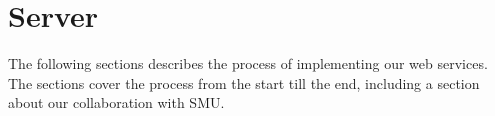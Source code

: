 \section{Server}
The following sections describes the process of implementing our web services. The sections cover the process from the start till the end, including a section about our collaboration with SMU.





